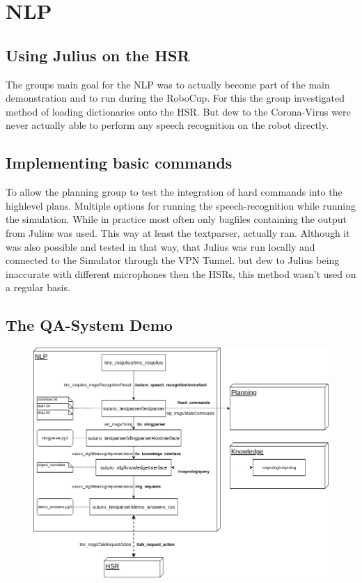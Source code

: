 \documentclass[main.tex]{subfiles}
\begin{document}
	
	\chapter{NLP}
    \section{Using Julius on the HSR}
        The groups main goal for the NLP was to actually become part of the main demonstration and to run during the RoboCup. For this the group investigated method of loading dictionaries onto the HSR. But dew to the Corona-Virus were never actually able to perform any speech recognition on the robot directly.
    \section{Implementing basic commands}
        To allow the planning group to test the integration of hard commands into the highlevel plans. Multiple options for running the speech-recognition while running the simulation. While in practice most often only bagfiles containing the output from Julius was used. This way at least the textparser, actually ran. Although it was also possible and tested in that way, that Julius was run locally and connected to the Simulator through the VPN Tunnel. but dew to Julius being inaccurate with different microphones then the HSRs, this method wasn't used on a regular basis.
    \section{The QA-System Demo}
        \begin{figure}[H]
            \centering
            \includegraphics[width=1.2\linewidth]{architecture/nlp}
            \caption{}
            \label{fig:nlp}
        \end{figure}
\end{document}
